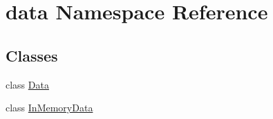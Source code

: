 \hypertarget{namespacedata}{}\section{data Namespace Reference}
\label{namespacedata}
\subsection*{Classes}
\begin{DoxyCompactItemize}
\item 
class \mbox{\hyperlink{classdata_1_1_data}{Data}}
\item 
class \mbox{\hyperlink{classdata_1_1_in_memory_data}{In\+Memory\+Data}}
\end{DoxyCompactItemize}
